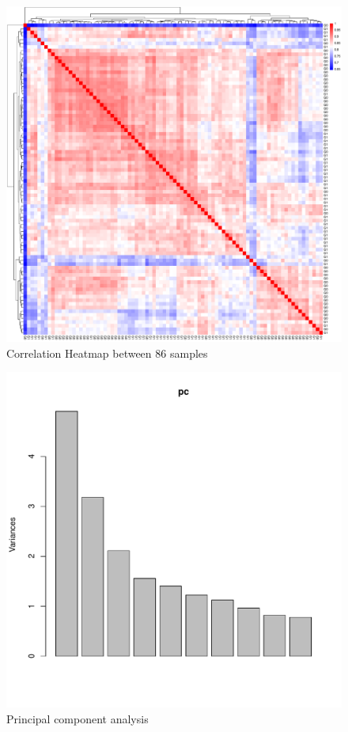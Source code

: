 \documentclass[journal, a4paper]{IEEEtran}
\begin{document}
	\begin{figure}[!hbt]
		\begin{center}
		\includegraphics[width=\columnwidth]{CorHeatmap.pdf}
		\caption{Correlation Heatmap between 86 samples}
		\label{fig:network}
		\end{center}
	\end{figure}
	
	\begin{figure}[!hbt]
		\begin{center}
		\includegraphics[width=\columnwidth]{pca.pdf}
		\caption{Principal component analysis}
		\label{fig:network}
		\end{center}
	\end{figure}
\end{document}

